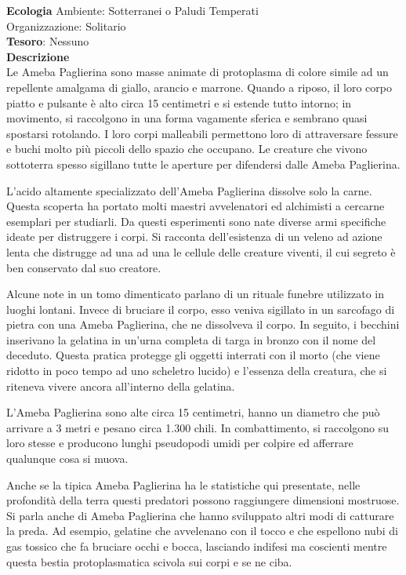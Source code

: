 \begin{multicols}{2}
	\textbf{Ecologia}
	Ambiente: Sotterranei o Paludi Temperati\\
	Organizzazione: Solitario\\
	\textbf{Tesoro}: Nessuno\\
	\textbf{Descrizione}\\
	Le Ameba Paglierina sono masse animate di protoplasma di colore simile ad un repellente amalgama di giallo, arancio e marrone. Quando a riposo, il loro corpo piatto e pulsante è alto circa 15 centimetri e si estende tutto intorno; in movimento, si raccolgono in una forma vagamente sferica e sembrano quasi spostarsi rotolando. I loro corpi malleabili permettono loro di attraversare fessure e buchi molto più piccoli dello spazio che occupano. Le creature che vivono sottoterra spesso sigillano tutte le aperture per difendersi dalle Ameba Paglierina.

	L'acido altamente specializzato dell'Ameba Paglierina dissolve solo la carne. Questa scoperta ha portato molti maestri avvelenatori ed alchimisti a cercarne esemplari per studiarli. Da questi esperimenti sono nate diverse armi specifiche ideate per distruggere i corpi. Si racconta dell'esistenza di un veleno ad azione lenta che distrugge ad una ad una le cellule delle creature viventi, il cui segreto è ben conservato dal suo creatore.

	Alcune note in un tomo dimenticato parlano di un rituale funebre utilizzato in luoghi lontani. Invece di bruciare il corpo, esso veniva sigillato in un sarcofago di pietra con una Ameba Paglierina, che ne dissolveva il corpo. In seguito, i becchini inserivano la gelatina in un'urna completa di targa in bronzo con il nome del deceduto. Questa pratica protegge gli oggetti interrati con il morto (che viene ridotto in poco tempo ad uno scheletro lucido) e l'essenza della creatura, che si riteneva vivere ancora all'interno della gelatina.

	L'Ameba Paglierina sono alte circa 15 centimetri, hanno un diametro che può arrivare a 3 metri e pesano circa 1.300 chili. In combattimento, si raccolgono su loro stesse e producono lunghi pseudopodi umidi per colpire ed afferrare qualunque cosa si muova.

	Anche se la tipica Ameba Paglierina ha le statistiche qui presentate, nelle profondità della terra questi predatori possono raggiungere dimensioni mostruose. Si parla anche di Ameba Paglierina che hanno sviluppato altri modi di catturare la preda. Ad esempio, gelatine che avvelenano con il tocco e che espellono nubi di gas tossico che fa bruciare occhi e bocca, lasciando indifesi ma coscienti mentre questa bestia protoplasmatica scivola sui corpi e se ne ciba.



\end{multicols}
